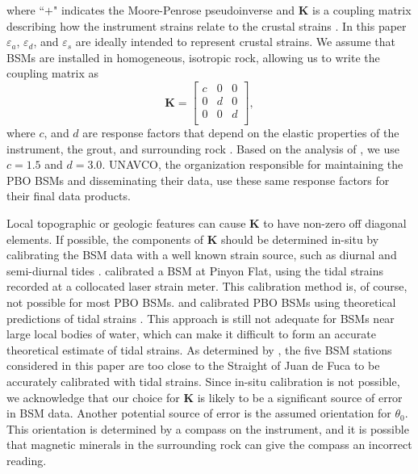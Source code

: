 \documentclass[10pt,a4paper]{article}
\begin{document}
where ``$+$" indicates the Moore-Penrose pseudoinverse and $\mathbf{K}$ is a coupling matrix describing how the instrument strains relate to the crustal strains \citep{Hart1996}. In this paper $\varepsilon_a$, $\varepsilon_d$, and $\varepsilon_s$ are ideally intended to represent crustal strains. We assume that BSMs are installed in homogeneous, isotropic rock, allowing us to write the coupling matrix as
\begin{equation}\label{eq:CouplingMatrix}
\mathbf{K} = 
\left[\begin{array}{ccc}
c & 0 & 0 \\
0 & d & 0 \\
0 & 0 & d \\
\end{array}\right],
\end{equation}  
where $c$, and $d$ are response factors that depend on the elastic properties of the instrument, the grout, and surrounding rock \citep{Gladwin1985}. Based on the analysis of \citet{Gladwin1985}, we use $c=1.5$ and $d=3.0$. UNAVCO, the organization responsible for maintaining the PBO BSMs and disseminating their data, use these same response factors for their final data products. 

Local topographic or geologic features can cause $\mathbf{K}$ to have non-zero off diagonal elements. If possible, the components of $\mathbf{K}$ should be determined in-situ by calibrating the BSM data with a well known strain source, such as diurnal and semi-diurnal tides \citep{Hart1996,Roeloffs2010,Hodgkinson2013}. \citet{Hart1996} calibrated a BSM at Pinyon Flat, using the tidal strains recorded at a collocated laser strain meter. This calibration method is, of course, not possible for most PBO BSMs. \citet{Roeloffs2010} and \citet{Hodgkinson2013} calibrated PBO BSMs using theoretical predictions of tidal strains \citep[e.g.,][]{Agnew1997}. This approach is still not adequate for BSMs near large local bodies of water, which can make it difficult to form an accurate theoretical estimate of tidal strains. As determined by \citet{Roeloffs2010}, the five BSM stations considered in this paper are too close to the Straight of Juan de Fuca to be accurately calibrated with tidal strains. Since in-situ calibration is not possible, we acknowledge that our choice for $\mathbf{K}$ is likely to be a significant source of error in BSM data. Another potential source of error is the assumed orientation for $\theta_0$. This orientation is determined by a compass on the instrument, and it is possible that magnetic minerals in the surrounding rock can give the compass an incorrect reading. 
\end{document}
